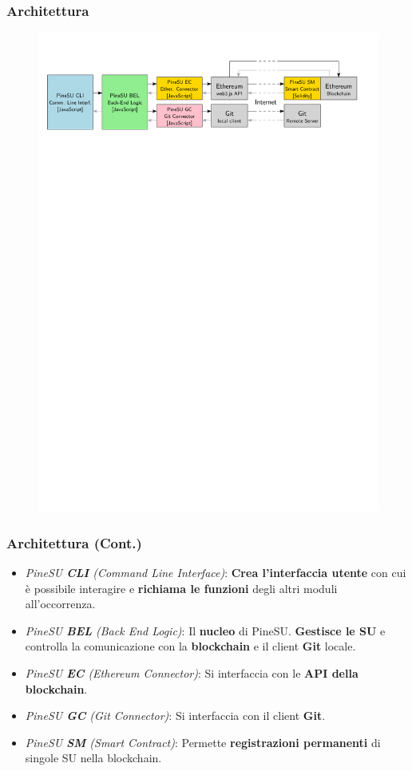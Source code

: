 \documentclass{beamer}
\begin{document}
\begin{frame}
	\frametitle{Architettura}
	\centering
	\begin{figure}
		\includegraphics[width=\textwidth]{figures/pineSU-architecture.pdf}
	\end{figure}
\end{frame}

\begin{frame}
	\frametitle{Architettura (Cont.)}
	\begin{itemize}
		\item \emph{PineSU \textbf{CLI} (Command Line Interface)}: \textbf{Crea l'interfaccia utente} con cui è possibile
			interagire e \textbf{richiama le funzioni} degli altri moduli all'occorrenza.
		\item \emph{PineSU \textbf{BEL} (Back End Logic)}: Il \textbf{nucleo} di PineSU.
		\textbf{Gestisce le SU} e controlla la comunicazione con la \textbf{blockchain} e il client \textbf{Git} locale.
		\item \emph{PineSU \textbf{EC} (Ethereum Connector)}: Si interfaccia con le \textbf{API della blockchain}. 
		\item \emph{PineSU \textbf{GC} (Git Connector)}: Si interfaccia con il client \textbf{Git}. 
		\item \emph{PineSU \textbf{SM} (Smart Contract)}: Permette \textbf{registrazioni permanenti} di singole SU nella blockchain.
	\end{itemize}
\end{frame}
\end{document}
